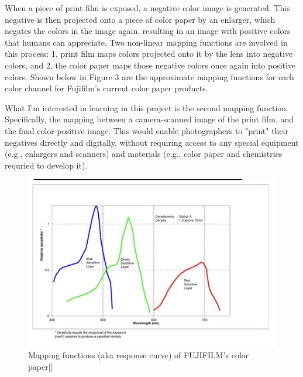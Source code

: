 \documentclass[twoside,11pt]{article}
\begin{document}
	When a piece of print film is exposed, a negative color image is generated. This negative is then projected onto a piece of color paper by an enlarger, which negates the colors in the image again, 
	resulting in an image with positive colors that humans can appreciate. Two non-linear mapping functions are involved in this process: 1, print film maps colors projected onto it by the lens into negative 
	colors, and 2, the color paper maps those negative colors once again into positive colors. Shown below in Figure 3 are the approximate mapping functions for each color channel for Fujifilm's current color paper products.
	
	What I'm interested in learning in this project is the second mapping function. Specifically, 
	the mapping between a camera-scanned image of the print film, and the final color-positive image. This would enable photographers to "print" their negatives directly and digitally, 
	without requiring access to any special equipment (e.g., enlargers and scanners) and materials (e.g., color paper and chemistries requried to develop it).


	\begin{figure}
		\centering
		\includegraphics[width=0.6\linewidth]{paper.png}
		\caption{Mapping functions (aka response curve) of FUJIFILM's color paper[\cite{fujifilm}]}
		\label{fig:paper}
	\end{figure}
\end{document}
